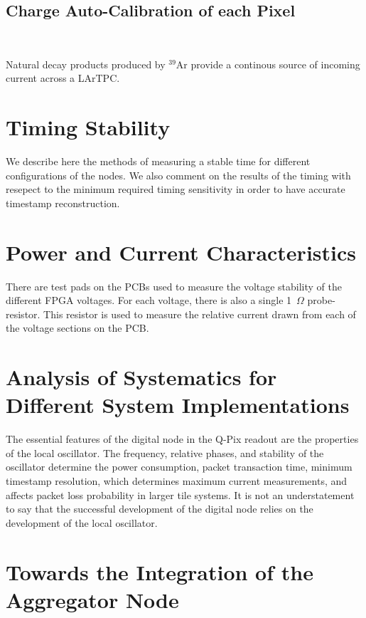 


\subsection{Charge Auto-Calibration of each Pixel}~\label{sec:charge_calibration}

Natural decay products produced by $^{39}$Ar provide a continous source of incoming current across a LArTPC.


\section{Timing Stability}

We describe here the methods of measuring a stable time for different configurations of the nodes.
We also comment on the results of the timing with resepect to the minimum required timing sensitivity in order to have accurate timestamp reconstruction.

\section{Power and Current Characteristics}

There are test pads on the PCBs used to measure the voltage stability of the different FPGA voltages.
For each voltage, there is also a single 1~$\unit{\Omega}$ probe-resistor.
This resistor is used to measure the relative current drawn from each of the voltage sections on the PCB.

\section{Analysis of Systematics for Different System Implementations}

The essential features of the digital node in the Q-Pix readout are the properties of the local oscillator.
The frequency, relative phases, and stability of the oscillator determine the power consumption, packet transaction time, minimum timestamp resolution, which determines maximum current measurements, and affects packet loss probability in larger tile systems.
It is not an understatement to say that the successful development of the digital node relies on the development of the local oscillator.

\section{Towards the Integration of the Aggregator Node}

